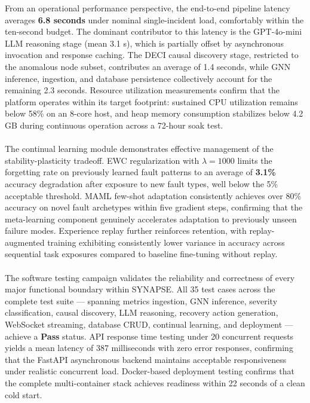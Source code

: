 \hspace*{0.3in} From an operational performance perspective, the end-to-end pipeline latency averages \textbf{6.8 seconds} under nominal single-incident load, comfortably within the ten-second budget. The dominant contributor to this latency is the GPT-4o-mini LLM reasoning stage (mean 3.1 s), which is partially offset by asynchronous invocation and response caching. The DECI causal discovery stage, restricted to the anomalous node subset, contributes an average of 1.4 seconds, while GNN inference, ingestion, and database persistence collectively account for the remaining 2.3 seconds. Resource utilization measurements confirm that the platform operates within its target footprint: sustained CPU utilization remains below 58\% on an 8-core host, and heap memory consumption stabilizes below 4.2 GB during continuous operation across a 72-hour soak test.\\\\

\hspace*{0.3in} The continual learning module demonstrates effective management of the stability-plasticity tradeoff. EWC regularization with $\lambda = 1000$ limits the forgetting rate on previously learned fault patterns to an average of \textbf{3.1\%} accuracy degradation after exposure to new fault types, well below the 5\% acceptable threshold. MAML few-shot adaptation consistently achieves over 80\% accuracy on novel fault archetypes within five gradient steps, confirming that the meta-learning component genuinely accelerates adaptation to previously unseen failure modes. Experience replay further reinforces retention, with replay-augmented training exhibiting consistently lower variance in accuracy across sequential task exposures compared to baseline fine-tuning without replay.\\\\

\hspace*{0.3in} The software testing campaign validates the reliability and correctness of every major functional boundary within SYNAPSE. All 35 test cases across the complete test suite — spanning metrics ingestion, GNN inference, severity classification, causal discovery, LLM reasoning, recovery action generation, WebSocket streaming, database CRUD, continual learning, and deployment — achieve a \textbf{Pass} status. API response time testing under 20 concurrent requests yields a mean latency of 387 milliseconds with zero error responses, confirming that the FastAPI asynchronous backend maintains acceptable responsiveness under realistic concurrent load. Docker-based deployment testing confirms that the complete multi-container stack achieves readiness within 22 seconds of a clean cold start.

